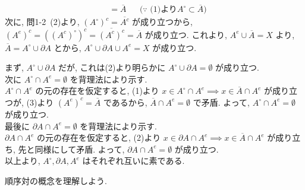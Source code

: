 {\begin{align*}
                            &= \overline{A}&&\text{($\because$ (1)より$A^\circ \subset \overline{A}$)} 
\end{align*}
次に, 問1-2\ (2)より, $(A^\circ)^c = \overline{A^c}$ が成り立つから, $(A^e)^c = ((A^c)^\circ)^c = \overline{(A^c)^c} = \overline{A}$ が成り立つ. これより, $A^e \cup \overline{A} = X$ より, 
$\overline{A} = A^\circ \cup \partial A$ とから, $A^\circ \cup \partial A \cup A^e = X$ が成り立つ.
\item
まず, $A^\circ \cup \partial A$ だが, これは(2)より明らかに $A^\circ \cup \partial A = \emptyset$ が成り立つ.\\
次に $A^\circ \cap A^e = \emptyset$ を背理法により示す.\\
$A^\circ \cap A^e$ の元の存在を仮定すると, (1)より $x \in A^\circ \cap A^e \implies x \in \overline{A} \cap A^e$ が成り立つが, (3)より $(A^e)^c = \overline{A}$ であるから, $\overline{A} \cap A^e = \emptyset$
で矛盾. よって, $A^\circ \cap A^e = \emptyset$ が成り立つ.\\
最後に $\partial A \cap A^e = \emptyset$ を背理法により示す.\\
$\partial A \cap A^e$ の元の存在を仮定すると, (2)より $x \in \partial A \cap A^e \implies x \in \overline{A} \cap A^e$ が成り立ち, 先と同様にして矛盾. よって, $\partial A \cap A^e = \emptyset$ が成り立つ.\\
以上より, $A^\circ, \partial A, A^e$ はそれぞれ互いに素である.
}

\newpage
順序対の概念を理解しよう.\\

